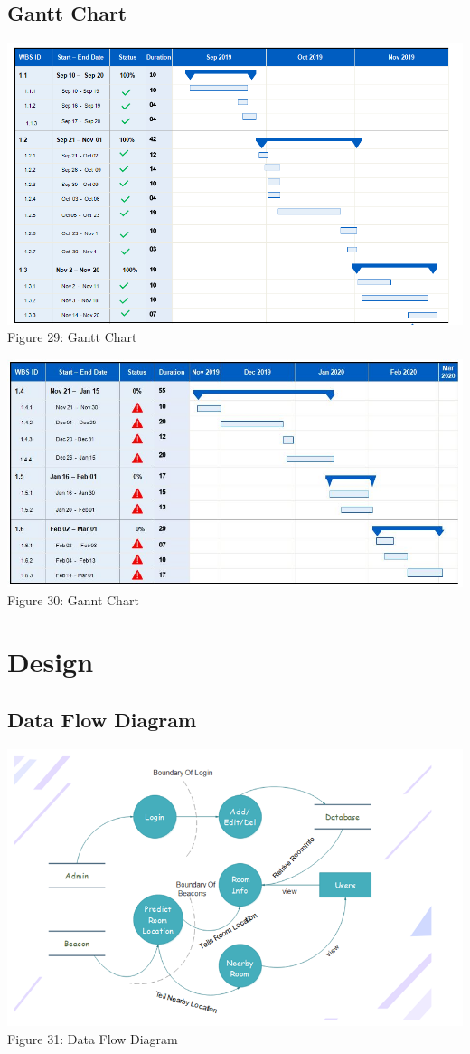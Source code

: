 \documentclass{article}
\begin{document}
\subsection{Gantt Chart}
\begin{center}
\includegraphics[scale=0.6]{gc1}
\\Figure 29: Gantt Chart
\end{center}
\begin{center}
\includegraphics[scale=0.6]{gc2}
\\Figure 30: Gannt Chart
\end{center}
\section{Design}
\subsection{Data Flow Diagram}
\begin{center}
\includegraphics[scale=0.8]{dfd}
\\Figure 31: Data Flow Diagram
\end{center}
\end{document}
